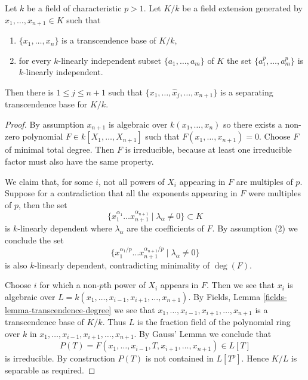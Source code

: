 \begin{lemma}
\label{lemma-mini-separability}
Let $k$ be a field of characteristic $p > 1$. Let $K/k$
be a field extension generated by $x_1, \ldots, x_{n + 1} \in K$ such that
\begin{enumerate}
\item $\{x_1, \ldots, x_n\}$ is a transcendence base of $K/k$,
\item for every $k$-linearly independent subset
$\{a_1, \ldots, a_m\}$ of $K$ the set
$\{a^p_1, \ldots, a_m^p\}$ is $k$-linearly independent.
\end{enumerate}
Then there is $1 \leq j \leq n+1$ such that
$\{ x_1, \ldots, \widehat{x}_j, \ldots, x_{n+1}\}$
is a separating transcendence base for $K / k$.
\end{lemma}

\begin{proof}
By assumption $x_{n + 1}$ is algebraic over $k(x_1, \ldots, x_n)$
so there exists a non-zero polynomial $F \in k[X_1, \ldots, X_{n + 1}]$
such that $F(x_1, \ldots, x_{n+1}) = 0$. Choose $F$ of minimal total degree.
Then $F$ is irreducible, because at least one irreducible factor
must also have the same property.

\medskip\noindent
We claim that, for some $i$, not all powers of $X_i$ appearing in $F$
are multiples of $p$. Suppose for a contradiction that all the exponents
appearing in $F$ were multiples of $p$, then the set
$$
\{x_1^{\alpha_1} \ldots x^{\alpha_{n+1}}_{n+1} \mid \lambda_\alpha \neq 0\}
\subset
K
$$
is $k$-linearly dependent where $\lambda_\alpha$ are the coefficients of $F$.
By assumption (2) we conclude the set
$$
\{x_1^{\alpha_1 / p} \ldots x^{\alpha_{n+1} / p}_{n+1}
\mid \lambda_\alpha \neq 0 \}
$$
is also $k$-linearly dependent, contradicting minimality of $\deg(F)$.

\medskip\noindent
Choose $i$ for which a non-$p$th power of $X_i$ appears in $F$. Then we
see that $x_i$ is algebraic over
$L = k(x_1, \ldots, x_{i - 1}, x_{i + 1}, \ldots, x_{n+1})$.
By Fields, Lemma \ref{fields-lemma-transcendence-degree}
we see that $x_1, \ldots, x_{i - 1}, x_{i + 1}, \ldots, x_{n+1}$
is a transcendence base of $K/k$. Thus $L$ is the fraction field
of the polynomial ring over $k$ in
$x_1, \ldots, x_{i - 1}, x_{i + 1}, \ldots, x_{n + 1}$.
By Gauss' Lemma we conclude that
$$
P(T) =
F(x_1, \ldots, x_{i - 1}, T, x_{i + 1}, \ldots, x_{n + 1}) \in L[T]
$$
is irreducible. By construction $P(T)$ is not contained in $L[T^p]$.
Hence $K/L$ is separable as required.
\end{proof}